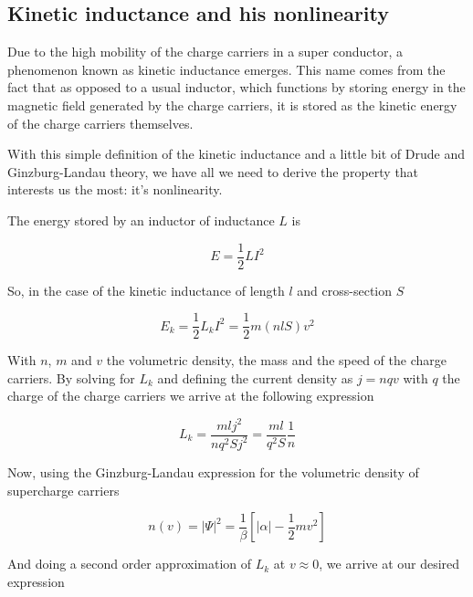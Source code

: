 \documentclass[../main.tex]{subfiles}
\begin{document}
\newpage
\subsection{Kinetic inductance and his nonlinearity}
\label{subsec:KineticInductance}
Due to the high mobility of the charge carriers in a super conductor, a phenomenon
known as kinetic inductance emerges. This name comes from the fact that as opposed
to a usual inductor, which functions by storing energy in the magnetic field
generated by the charge carriers, it is stored as the kinetic energy of the
charge carriers themselves.

With this simple definition of the kinetic inductance and a little bit of
Drude and Ginzburg-Landau theory, we have all we need to derive the property
that interests us the most: it's nonlinearity.

The energy stored by an inductor of inductance \(L\) is

\begin{equation*}
\label{eq:InductiveEnergy}
    E = \frac{1}{2}LI^2
\end{equation*}

So, in the case of the kinetic inductance of length \(l\) and cross-section \(S\)

\begin{equation*}
\label{eq:KineticInductiveEnergy}
    E_{k} = \frac{1}{2}L_{k}I^2 = \frac{1}{2}m(nlS)v^2
\end{equation*}

With \(n\), \(m\) and \(v\) the volumetric density, the mass and the speed of
the charge carriers. By solving for \(L_{k}\) and defining the
current density as \(j=nqv\) with \(q\) the charge of the charge carriers
we arrive at the following expression

\begin{equation*}
\label{eq:LkOfn}
    L_{k} = \frac{mlj^2}{nq^2Sj^2} = \frac{ml}{q^2S}\frac{1}{n}
\end{equation*}

Now, using the Ginzburg-Landau expression for the volumetric density of supercharge
carriers

\begin{equation*}
\label{eq:GLn}
    n(v) = |\Psi|^2 = \frac{1}{\beta}\left[|\alpha| - \frac{1}{2}m v^2\right]
\end{equation*}

And doing a second order approximation of \(L_{k}\) at \(v \approx 0\), we arrive
at our desired expression
\end{document}

